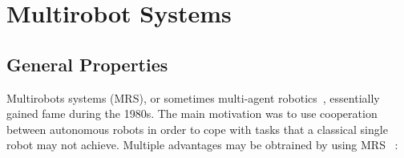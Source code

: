 \section{Multirobot Systems}

  






  \subsection{General Properties} 

    Multirobots systems (MRS), or sometimes multi-agent robotics~\parencite{Dudek1996}, essentially gained fame during the 1980s. The main motivation was to use cooperation between autonomous robots in order to cope with tasks that a classical single robot may not achieve. Multiple advantages may be obtrained by using MRS~\parencite{Cao1997, Arkin1998} :

